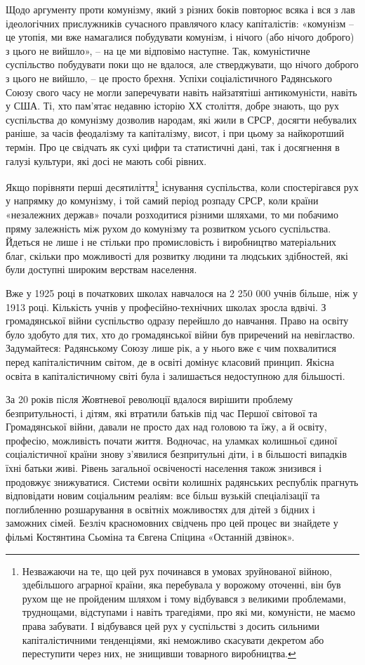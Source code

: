\documentclass[12pt,a4paper,openany]{book}
\begin{document}
Щодо аргументу проти комунізму, який з різних боків повторює всяка і вся з лав ідеологічних прислужників сучасного правлячого класу капіталістів: «комунізм – це утопія, ми вже намагалися побудувати комунізм, і нічого (або нічого доброго) з цього не вийшло», – на це ми відповімо наступне. Так, комуністичне суспільство побудувати поки що не вдалося, але стверджувати, що нічого доброго з цього не вийшло, – це просто брехня. Успіхи соціалістичного Радянського Союзу свого часу не могли заперечувати навіть найзатятіші антикомуністи, навіть у США. Ті, хто пам’ятає недавню історію ХХ століття, добре знають, що рух суспільства до комунізму дозволив народам, які жили в СРСР, досягти небувалих раніше, за часів феодалізму та капіталізму, висот, і при цьому за найкоротший термін. Про це свідчать як сухі цифри та статистичні дані, так і досягнення в галузі культури, які досі не мають собі рівних.

Якщо порівняти перші десятиліття\footnote{Незважаючи на те, що цей рух починався в умовах зруйнованої війною, здебільшого аграрної країни, яка перебувала у ворожому оточенні, він був рухом ще не пройденим шляхом і тому відбувався з великими проблемами, труднощами, відступами і навіть трагедіями, про які ми, комуністи, не маємо права забувати. І відбувався цей рух у суспільстві з досить сильними капіталістичними тенденціями, які неможливо скасувати декретом або переступити через них, не знищивши товарного виробництва.} існування суспільства, коли спостерігався рух у напрямку до комунізму, і той самий період розпаду СРСР, коли країни «незалежних держав» почали розходитися різними шляхами, то ми побачимо пряму залежність між рухом до комунізму та розвитком усього суспільства. Йдеться не лише і не стільки про промисловість і виробництво матеріальних благ, скільки про можливості для розвитку людини та людських здібностей, які були доступні широким верствам населення.

Вже у 1925 році в початкових школах навчалося на 2 250 000 учнів більше, ніж у 1913 році. Кількість учнів у професійно-технічних школах зросла вдвічі. З громадянської війни суспільство одразу перейшло до навчання. Право на освіту було здобуто для тих, хто до громадянської війни був приречений на невігластво. Задумайтеся: Радянському Союзу лише рік, а у нього вже є чим похвалитися перед капіталістичним світом, де в освіті домінує класовий принцип. Якісна освіта в капіталістичному світі була і залишається недоступною для більшості.

За 20 років після Жовтневої революції вдалося вирішити проблему безпритульності, і дітям, які втратили батьків під час Першої світової та Громадянської війни, давали не просто дах над головою та їжу, а й освіту, професію, можливість почати життя. Водночас, на уламках колишньої єдиної соціалістичної країни знову з’явилися безпритульні діти, і в більшості випадків їхні батьки живі. Рівень загальної освіченості населення також знизився і продовжує знижуватися. Системи освіти колишніх радянських республік прагнуть відповідати новим соціальним реаліям: все більш вузькій спеціалізації та поглибленню розшарування в освітніх можливостях для дітей з бідних і заможних сімей. Безліч красномовних свідчень про цей процес ви знайдете у фільмі Костянтина Сьоміна та Євгена Спіцина «Останній дзвінок».
\end{document}
